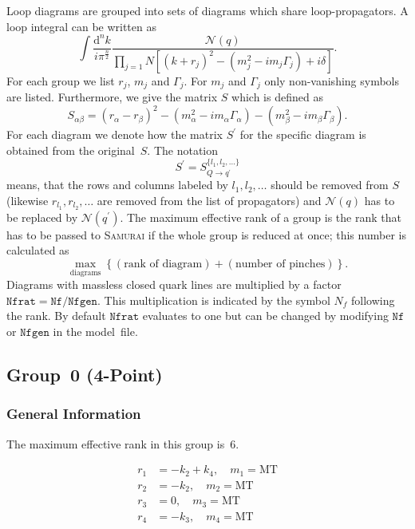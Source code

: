 \documentclass[a4paper]{article}
\begin{document}
Loop diagrams are grouped into sets of diagrams which share
loop-propagators. A loop integral can be written as
\begin{equation}
\int\!\frac{\mathrm{d}^nk}{i\pi^{\frac{n}{2}}}%
\frac{\mathcal{N}(q)}{\prod_{j=1}{N}\left[(k+r_j)^2-(m_j^2
   -i m_j\Gamma_j) + i\delta\right]}.
\end{equation}
For each group we list $r_j$, $m_j$ and $\Gamma_j$.
For $m_j$ and $\Gamma_j$ only non-vanishing symbols are listed.
Furthermore, we give the matrix $S$ which is defined as
\begin{equation}
S_{\alpha\beta} = (r_\alpha-r_\beta)^2
-(m_\alpha^2-im_\alpha\Gamma_\alpha)
-(m_\beta^2-im_\beta\Gamma_\beta).
\end{equation}
For each diagram we denote how the matrix $S^\prime$ for the specific diagram
is obtained from the original~$S$. The notation
\begin{equation}
S^\prime=S_{Q\to q^\prime}^{\{l_1,l_2,\ldots\}}
\end{equation}
means, that the rows and columns labeled by $l_1,l_2,\ldots$ should be
removed from $S$ (likewise $r_{l_1}, r_{l_2}, \ldots$ are removed from the
list of propagators) and $\mathcal{N}(q)$ has to be replaced by
$\mathcal{N}(q^\prime)$.
The maximum effective rank of a group is the rank that has to be passed
to \textsc{Samurai} if the whole group is reduced at once; this number
is calculated as
\begin{equation}
\max_{\text{diagrams}}\left\{(\text{rank of diagram})+
(\text{number of pinches})\right\}.
\end{equation}
Diagrams with massless closed quark lines are multiplied by a factor
$\mathtt{Nfrat}=\mathtt{Nf}/\mathtt{Nfgen}$. This multiplication is indicated
by the symbol $N_f$ following the rank. By default $\mathtt{Nfrat}$ evaluates
to one but can be changed by modifying $\mathtt{Nf}$ or $\mathtt{Nfgen}$ in the
model~file.


\subsection{Group~0 (4-Point)}
\subsubsection*{General Information}
The maximum effective rank in this group is~6.

\begin{subequations}
\begin{align}
r_{1} &= -k_{2}+k_{4},\quad m_{1} = \text{MT}\\
r_{2} &= -k_{2},\quad m_{2} = \text{MT}\\
r_{3} &= 0,\quad m_{3} = \text{MT}\\
r_{4} &= -k_{3},\quad m_{4} = \text{MT}
\end{align}
\end{subequations}
\end{document}
